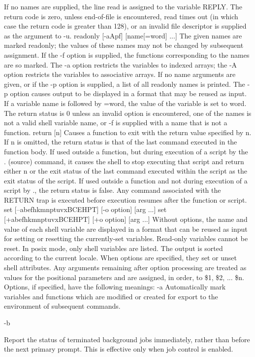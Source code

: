 {{{If no names are supplied, the line read is assigned to the variable REPLY. The return code is zero, unless end-of-file is encountered, read times out (in which case the return code is greater than 128), or an invalid file descriptor is supplied as the argument to -u.
readonly [-aApf] [name[=word] ...]
The given names are marked readonly; the values of these names may not be changed by subsequent assignment. If the -f option is supplied, the functions corresponding to the names are so marked. The -a option restricts the variables to indexed arrays; the -A option restricts the variables to associative arrays. If no name arguments are given, or if the -p option is supplied, a list of all readonly names is printed. The -p option causes output to be displayed in a format that may be reused as input. If a variable name is followed by =word, the value of the variable is set to word. The return status is 0 unless an invalid option is encountered, one of the names is not a valid shell variable name, or -f is supplied with a name that is not a function.
return [n]
Causes a function to exit with the return value specified by n. If n is omitted, the return status is that of the last command executed in the function body. If used outside a function, but during execution of a script by the . (source) command, it causes the shell to stop executing that script and return either n or the exit status of the last command executed within the script as the exit status of the script. If used outside a function and not during execution of a script by ., the return status is false. Any command associated with the RETURN trap is executed before execution resumes after the function or script.
set [--abefhkmnptuvxBCEHPT] [-o option] [arg ...]
set [+abefhkmnptuvxBCEHPT] [+o option] [arg ...]
Without options, the name and value of each shell variable are displayed in a format that can be reused as input for setting or resetting the currently-set variables. Read-only variables cannot be reset. In posix mode, only shell variables are listed. The output is sorted according to the current locale. When options are specified, they set or unset shell attributes. Any arguments remaining after option processing are treated as values for the positional parameters and are assigned, in order, to \$1, \$2, ... \$n. Options, if specified, have the following meanings:
-a
Automatically mark variables and functions which are modified or created for export to the environment of subsequent commands.

-b

Report the status of terminated background jobs immediately, rather than before the next primary prompt. This is effective only when job control is enabled.

}}}
